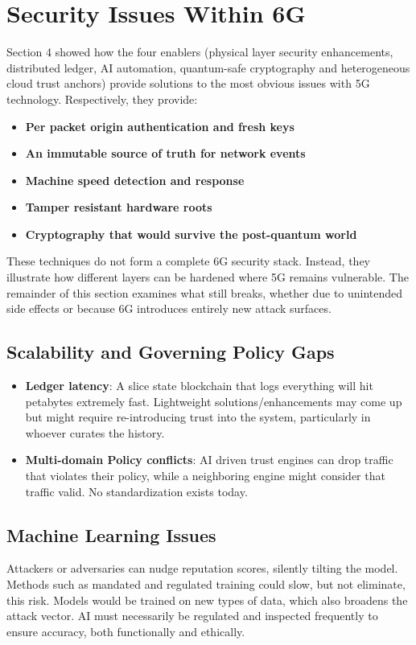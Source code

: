 \documentclass[acmtog]{acmart}
\begin{document}
\section{Security Issues Within 6G}
Section 4 showed how the four enablers (physical layer security enhancements, distributed ledger, AI automation, quantum-safe cryptography and heterogeneous cloud trust anchors) provide solutions to the most obvious issues with 5G technology. Respectively, they provide:
\begin{itemize}
  \item \textbf{Per packet origin authentication and fresh keys} 
  \item \textbf{An immutable source of truth for network events} 
  \item \textbf{Machine speed detection and response} 
  \item \textbf{Tamper resistant hardware roots} 
  \item \textbf{Cryptography that would survive the post-quantum world} 
\end{itemize}
These techniques do not form a complete 6G security stack. Instead, they illustrate how different layers can be hardened where 5G remains vulnerable. The remainder of this section examines what still breaks, whether due to unintended side effects or because 6G introduces entirely new attack surfaces.

\subsection{Scalability and Governing Policy Gaps}
\begin{itemize}
  \item \textbf{Ledger latency}: A slice state blockchain that logs everything will hit petabytes extremely fast. Lightweight solutions/enhancements may come up but might require re-introducing trust into the system, particularly in whoever curates the history.
  \item \textbf{Multi-domain Policy conflicts}: AI driven trust engines can drop traffic that violates their policy, while a neighboring engine might consider that traffic valid. No standardization exists today.
\end{itemize}

\subsection{Machine Learning Issues}
Attackers or adversaries can nudge reputation scores, silently tilting the model. Methods such as mandated and regulated training could slow, but not eliminate, this risk. Models would be trained on new types of data, which also broadens the attack vector. AI must necessarily be regulated and inspected frequently to ensure accuracy, both functionally and ethically.
\end{document}
